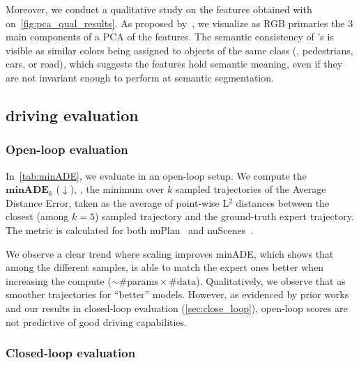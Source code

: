 Moreover, we conduct a qualitative study on the features obtained with \vm on~\autoref{fig:pca_qual_results}. As proposed by~\cite{Caron2021EmergingPI}, we visualize as RGB primaries the 3 main components of a PCA of the features. The semantic consistency of \vm's is visible as similar colors being assigned to objects of the same class (\eg, pedestrians, cars, or road), which suggests the features hold semantic meaning, even if they are not invariant enough to perform at semantic segmentation. 






\subsection{\vam{} driving evaluation}
\label{sec:evaluation_actionexpert}

\subsubsection{Open-loop evaluation}

In~\autoref{tab:minADE}, we evaluate \vam in an open-loop setup. We compute the $\textbf{minADE}_k$ ($\downarrow$), \ie, the minimum over $k$ sampled trajectories of the Average Distance Error, taken as the average of point-wise L$^2$ distances between the closest (among $k=5$) sampled trajectory and the ground-truth expert trajectory. The metric is calculated for both nuPlan~\cite{caesar2021nuplan} and nuScenes~\cite{caesar2020nuscenes}.


We observe a clear trend where scaling improves minADE, which shows that among the different samples, \vam is able to match the expert ones better when increasing the compute ($\sim \text{\# params} \times \text{\# data}$). Qualitatively, we observe that as smoother trajectories for ``better'' models. However, as evidenced by prior works~\cite{codevilla2018offlineEval,dauner2023parting} and our results in closed-loop evaluation (\autoref{sec:close_loop}), open-loop scores are not predictive of good driving capabilities.




\subsubsection{Closed-loop evaluation}
\label{sec:close_loop}

